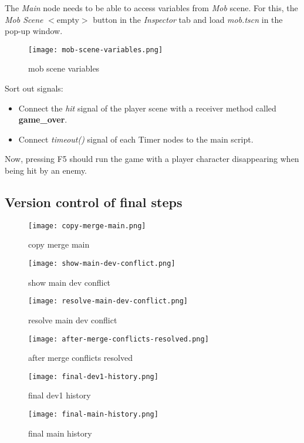 The \textit{Main} node needs to be able to access variables from \textit{Mob} scene. For this, the 
\textit{Mob Scene} {$<$}empty{$>$} button in the \textit{Inspector} tab and load \textit{mob.tscn} in the pop-up window.
\begin{figure}[H]
    \centering
    \texttt{[image: mob-scene-variables.png]}
    \caption{mob scene variables}
    \label{fig:mob-scene-variables}
\end{figure}
Sort out signals:
\begin{itemize}
    \item Connect the \textit{hit} signal of the player scene with a receiver method called \textbf{game\_over}.
    \item Connect \textit{timeout()} signal of each Timer nodes to the main script.
\end{itemize}
Now, pressing F5 should run the game with a player character disappearing when being hit by an enemy.
\subsection{Version control of final steps}
\begin{figure}[H]
    \centering
    \texttt{[image: copy-merge-main.png]}
    \caption{copy merge main}
    \label{fig:copy-merge-main}
\end{figure}

\begin{figure}[H]
    \centering
    \texttt{[image: show-main-dev-conflict.png]}
    \caption{show main dev conflict}
    \label{fig:show-main-dev-conflict}
\end{figure}

\begin{figure}[H]
    \centering
    \texttt{[image: resolve-main-dev-conflict.png]}
    \caption{resolve main dev conflict}
    \label{fig:resolve-main-dev-conflict}
\end{figure}

\begin{figure}[H]
    \centering
    \texttt{[image: after-merge-conflicts-resolved.png]}
    \caption{after merge conflicts resolved}
    \label{fig:after-merge-conflicts-resolved}
\end{figure}

\begin{figure}[H]
    \centering
    \texttt{[image: final-dev1-history.png]}
    \caption{final dev1 history}
    \label{fig:final-dev1-history}
\end{figure}

\begin{figure}[H]
    \centering
    \texttt{[image: final-main-history.png]}
    \caption{final main history}
    \label{fig:final-main-history}
\end{figure}
